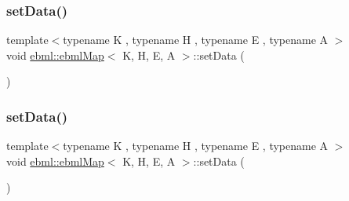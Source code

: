 \mbox{\label{classebml_1_1ebmlMap_aee0f35c791ed14dee89d6e81f47ce58e}} 
\subsubsection{\texorpdfstring{set\+Data()}{setData()}\hspace{0.1cm}{\footnotesize\ttfamily [4/11]}}
{\footnotesize\ttfamily template$<$typename K , typename H , typename E , typename A $>$ \\
void \mbox{\hyperlink{classebml_1_1ebmlMap}{ebml\+::ebml\+Map}}$<$ K, H, E, A $>$\+::set\+Data (\begin{DoxyParamCaption}\item[{const std\+::list$<$ \mbox{\hyperlink{namespaceebml_adad533b7705a16bb360fe56380c5e7be}{ebml\+Element\+\_\+sp}} $>$ \&}]{ }\end{DoxyParamCaption})}

\mbox{\label{classebml_1_1ebmlMap_af3dc95ad8188d5f66235dc58ce304251}} 
\subsubsection{\texorpdfstring{set\+Data()}{setData()}\hspace{0.1cm}{\footnotesize\ttfamily [5/11]}}
{\footnotesize\ttfamily template$<$typename K , typename H , typename E , typename A $>$ \\
void \mbox{\hyperlink{classebml_1_1ebmlMap}{ebml\+::ebml\+Map}}$<$ K, H, E, A $>$\+::set\+Data (\begin{DoxyParamCaption}\item[{const std\+::list$<$ std\+::pair$<$ \mbox{\hyperlink{namespaceebml_adad533b7705a16bb360fe56380c5e7be}{ebml\+Element\+\_\+sp}}, \mbox{\hyperlink{namespaceebml_adad533b7705a16bb360fe56380c5e7be}{ebml\+Element\+\_\+sp}} $>$$>$ \&}]{ }\end{DoxyParamCaption})}

\mbox{\label{classebml_1_1ebmlMap_ae3174082f9f1036e040ce94fa7a85ebd}} 
